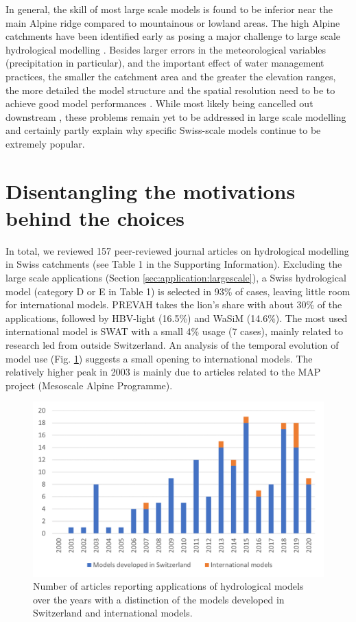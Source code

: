 \documentclass[10pt,a4paper]{article}
\begin{document}
In general, the skill of most large scale models is found to be inferior near the main Alpine ridge compared to mountainous or lowland areas. The high Alpine catchments have been identified early as posing a major challenge to large scale hydrological modelling \citep{Kleinn_2005}.  Besides larger errors in the meteorological variables (precipitation in particular), and the important effect of water management practices, the smaller the catchment area and the greater the elevation ranges, the more detailed the model structure and the spatial resolution need to be to achieve good model performances \citep{Gurtz2003}. While most likely being cancelled out downstream \citep{Kleinn_2005}, these problems remain yet to be addressed in large scale modelling and certainly partly explain why specific Swiss-scale models continue to be extremely popular. 

\section{Disentangling the motivations behind the choices}
\label{sec:motivations}

In total, we reviewed 157 peer-reviewed journal articles on hydrological modelling in Swiss catchments (see Table 1 in the Supporting Information). Excluding the large scale applications (Section \ref{sec:application:largescale}), a Swiss hydrological model (category D or E in Table 1) is selected in 93\% of cases, leaving little room for international models. PREVAH takes the lion's share with about 30\% of the applications, followed by HBV-light (16.5\%) and WaSiM (14.6\%). The most used international model is SWAT with a small 4\% usage (7 cases), mainly related to research led from outside Switzerland. An analysis of the temporal evolution of model use (Fig. \ref{fig:bars}) suggests a small opening to international models. The relatively higher peak in 2003 is mainly due to articles related to the MAP project (Mesoscale Alpine Programme).

\begin{figure}[htb]
	\begin{center}
		\includegraphics[width=0.70\columnwidth]{figures/histogram.png}
		\caption{{Number of articles reporting applications of hydrological models over
				the years with a distinction of the models developed in Switzerland and
				international models.
				{\label{fig:bars}}
		}}
	\end{center}
\end{figure}
\end{document}
